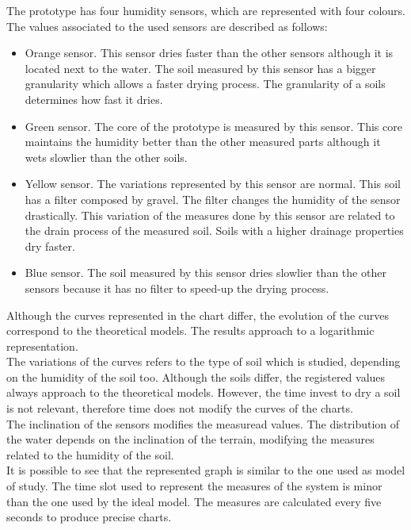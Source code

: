 The prototype has four humidity sensors, which are represented with four colours. The values associated to the used sensors are described as follows:

\begin{itemize}

\item Orange sensor. This sensor dries faster than the other sensors although it is located next to the water. The soil measured by this sensor has a bigger granularity which allows a faster drying process. The granularity of a soils determines how fast it dries.

\item Green sensor. The core of the prototype is measured by this sensor. This core maintains the humidity better than the other measured parts although it wets slowlier than the other soils.

\item Yellow sensor. The variations represented by this sensor are normal. This soil has a filter composed by gravel. The filter changes the humidity of the sensor drastically. This variation of the measures done by this sensor are related to the drain process of the measured soil. Soils with a higher drainage properties dry faster.

\item Blue sensor. The soil measured by this sensor dries slowlier than the other sensors because it has no filter to speed-up the drying process.

\end{itemize}

Although the curves represented in the chart differ, the evolution of the curves correspond to the theoretical models. The results approach to a logarithmic representation.\\

The variations of the curves refers to the type of soil which is studied, depending on the humidity of the soil too. Although the soils differ, the registered values always approach to the theoretical models. However, the time invest to dry a soil is not relevant, therefore time does not modify the curves of the charts.\\

The inclination of the sensors modifies the measuread values. The distribution of the water depends on the inclination of the terrain, modifying the measures related to the humidity of the soil.\\

It is possible to see that the represented graph is similar to the one used as model of study. The time slot used to represent the measures of the system is minor than the one used by the ideal model. The measures are calculated every five seconds to produce precise charts.\\

